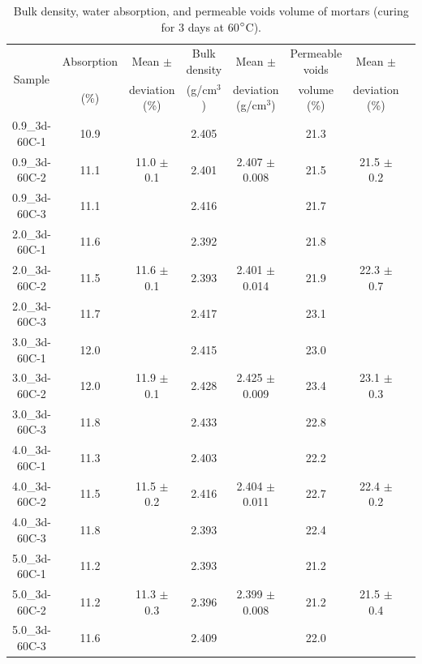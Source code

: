 \begin{landscape}
  \begin{table}[H]
    \centering
    \caption{Bulk density, water absorption, and permeable voids volume of mortars (curing for 3 days at 60$^{\circ}$C).}
    \label{tab:bulk_density_water_absorption}
    \begin{tabular}{cccccccc}
      \hline
      \multirow{2}{*}{Sample}        & Absorption & Mean $\pm$  & Bulk density & Mean $\pm$ & Permeable voids  & Mean $\pm$\\
       & (\%) & deviation (\%) & (g/cm$^3$) & deviation (g/cm$^3$) & volume (\%) & deviation (\%) \\
      \hline
      0.9\_3d-60C-1 & 10.9 & \multirow{3}{*}{11.0 $\pm$ 0.1} & 2.405 & \multirow{3}{*}{2.407 $\pm$ 0.008} & 21.3 & \multirow{3}{*}{21.5 $\pm$ 0.2} \\
      0.9\_3d-60C-2 & 11.1 & & 2.401 & & 21.5 & \\
      0.9\_3d-60C-3 & 11.1 & & 2.416 & & 21.7 & \\
      2.0\_3d-60C-1 & 11.6 & \multirow{3}{*}{11.6 $\pm$ 0.1} & 2.392 & \multirow{3}{*}{2.401 $\pm$ 0.014} & 21.8 & \multirow{3}{*}{22.3 $\pm$ 0.7} \\
      2.0\_3d-60C-2 & 11.5 & & 2.393 & & 21.9 & \\
      2.0\_3d-60C-3 & 11.7 & & 2.417 & & 23.1 & \\
      3.0\_3d-60C-1 & 12.0 & \multirow{3}{*}{11.9 $\pm$ 0.1} & 2.415 & \multirow{3}{*}{2.425 $\pm$ 0.009} & 23.0 & \multirow{3}{*}{23.1 $\pm$ 0.3} \\
      3.0\_3d-60C-2 & 12.0 & & 2.428 & & 23.4 & \\
      3.0\_3d-60C-3 & 11.8 & & 2.433 & & 22.8 & \\
      4.0\_3d-60C-1 & 11.3 & \multirow{3}{*}{11.5 $\pm$ 0.2} & 2.403 & \multirow{3}{*}{2.404 $\pm$ 0.011} & 22.2 & \multirow{3}{*}{22.4 $\pm$ 0.2} \\
      4.0\_3d-60C-2 & 11.5 & & 2.416 & & 22.7 & \\
      4.0\_3d-60C-3 & 11.8 & & 2.393 & & 22.4 & \\
      5.0\_3d-60C-1 & 11.2 & \multirow{3}{*}{11.3 $\pm$ 0.3} & 2.393 & \multirow{3}{*}{2.399 $\pm$ 0.008} & 21.2 & \multirow{3}{*}{21.5 $\pm$ 0.4} \\
      5.0\_3d-60C-2 & 11.2 & & 2.396 & & 21.2 & \\
      5.0\_3d-60C-3 & 11.6 & & 2.409 & & 22.0 & \\
      \hline
    \end{tabular}
  \end{table}
\end{landscape}

